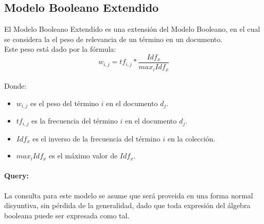 \documentclass{llncs}
\begin{document}
	\subsection{Modelo Booleano Extendido}
	El Modelo Booleano Extendido es una extensi\'on del Modelo Booleano, en el cual se considera la
	el peso de relevancia de un t\'ermino en un documento.\\
	Este peso est\'a dado por la f\'ormula:\\
	\begin{equation}
		w_{i,j} = tf_{i,j}*\frac{Idf_{x}}{max_{i}Idf_{x}}
	\end{equation}
	\\
	Donde: \\
	\begin{itemize}
		\item $w_{i,j}$ es el peso del t\'ermino $i$ en el documento $d_{j}$.
		\item $tf_{i,j}$ es la frecuencia del t\'ermino $i$ en el documento $d_{j}$.
		\item $Idf_{x}$ es el inverso de la frecuencia del t\'ermino $i$ en la colecci\'on.
		\item $max_{i}Idf_{x}$ es el m\'aximo valor de $Idf_{x}$.
	\end{itemize}
	
	\paragraph*{Query:}
	La consulta para este modelo se asume que ser\'a proveida en una forma normal disyuntiva, sin p\'erdida de la generalidad,
	dado que toda expresi\'on del \'algebra booleana puede ser expresada como tal.\\
\end{document}
